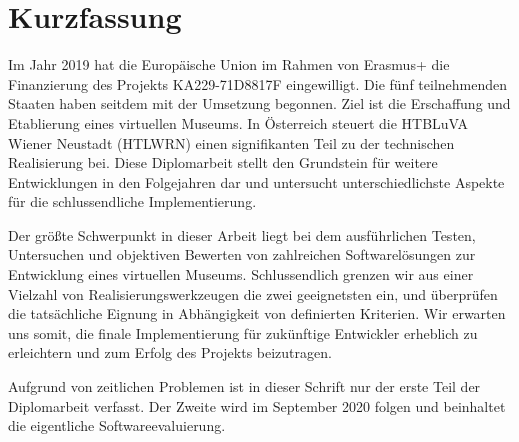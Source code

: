 \chapter{Kurzfassung}

Im Jahr 2019 hat die Europäische Union im Rahmen von Erasmus+ die Finanzierung des Projekts KA229-71D8817F eingewilligt. Die fünf teilnehmenden Staaten haben seitdem mit der Umsetzung begonnen. Ziel ist die Erschaffung und Etablierung eines virtuellen Museums. In Österreich steuert die HTBLuVA Wiener Neustadt (HTLWRN) einen signifikanten Teil zu der technischen Realisierung bei. Diese Diplomarbeit stellt den Grundstein für weitere Entwicklungen in den Folgejahren dar und untersucht unterschiedlichste Aspekte für die schlussendliche Implementierung.

Der größte Schwerpunkt in dieser Arbeit liegt bei dem ausführlichen Testen, Untersuchen und objektiven Bewerten von zahlreichen Softwarelösungen zur Entwicklung eines virtuellen Museums. Schlussendlich grenzen wir aus einer Vielzahl von Realisierungswerkzeugen die zwei geeignetsten ein, und überprüfen die tatsächliche Eignung in Abhängigkeit von definierten Kriterien. Wir erwarten uns somit, die finale Implementierung für zukünftige Entwickler erheblich zu erleichtern und zum Erfolg des Projekts beizutragen.

Aufgrund von zeitlichen Problemen ist in dieser Schrift nur der erste Teil der Diplomarbeit verfasst. Der Zweite wird im September 2020 folgen und beinhaltet die eigentliche Softwareevaluierung.